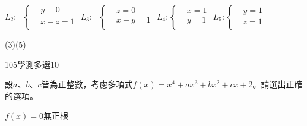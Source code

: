 \begin{QUESTIONS}
\begin{QUESTION}
\begin{QBODY}
\begin{QOPS}
                \QOP ${{L}_{\text{2}}}:\text{ }\left\{ \begin{aligned}
				  & y=0 \\ 
				 & x+z=1 \\ 
				\end{aligned} \right.$	
                \QOP ${{L}_{3}}:\text{ }\left\{ \begin{aligned}
				  & z=0 \\ 
				 & x+y=1 \\ 
				\end{aligned} \right.$
				\QOP ${{L}_{4}}:\left\{ \begin{aligned}
				  & x=1 \\ 
				 & y=1 \\ 
				\end{aligned} \right.$	
                \QOP ${{L}_{5}}:\left\{ \begin{aligned}
				  & y=1 \\ 
				 & z=1 \\ 
				\end{aligned} \right. $
			\end{QOPS}
        \end{QBODY}
        \begin{QFROMS}
        \end{QFROMS}
        \begin{QTAGS}\end{QTAGS}
        \begin{QANS}
            (3)(5)
        \end{QANS}
        \begin{QSOLLIST}
        \end{QSOLLIST}
        \begin{QEMPTYSPACE}
        \end{QEMPTYSPACE}
    \end{QUESTION}
    \begin{QUESTION}
        \begin{ExamInfo}{105}{學測}{多選}{10}
        \end{ExamInfo}
        \begin{ExamAnsRateInfo}{34}{59}{28}{15}
        \end{ExamAnsRateInfo}
        \begin{QBODY}
            設$a$、$b$、$c$皆為正整數，考慮多項式$f(x)={{x}^{4}}+a{{x}^{3}}+b{{x}^{2}}+cx+2$。請選出正確的選項。
			\begin{QOPS}
				\QOP $f(x)=0$無正根

\end{QOPS}
\end{QBODY}
\end{QUESTION}
\end{QUESTIONS}
